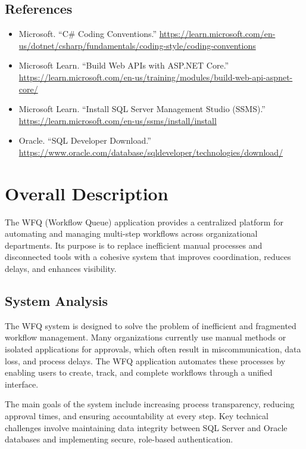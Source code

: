 \documentclass[12pt]{article}
\begin{document}
\subsection{References}
\begin{itemize}
    \item Microsoft. ``C\# Coding Conventions.'' \url{https://learn.microsoft.com/en-us/dotnet/csharp/fundamentals/coding-style/coding-conventions}
    \item Microsoft Learn. ``Build Web APIs with ASP.NET Core.'' \url{https://learn.microsoft.com/en-us/training/modules/build-web-api-aspnet-core/}
    \item Microsoft Learn. ``Install SQL Server Management Studio (SSMS).'' \url{https://learn.microsoft.com/en-us/ssms/install/install}
    \item Oracle. ``SQL Developer Download.'' \url{https://www.oracle.com/database/sqldeveloper/technologies/download/}
\end{itemize}

\section{Overall Description}

The WFQ (Workflow Queue) application provides a centralized platform for automating and
managing multi-step workflows across organizational departments. Its purpose is to replace
inefficient manual processes and disconnected tools with a cohesive system that improves
coordination, reduces delays, and enhances visibility.

\subsection{System Analysis}
The WFQ system is designed to solve the problem of inefficient and fragmented workflow
management. Many organizations currently use manual methods or isolated applications for
approvals, which often result in miscommunication, data loss, and process delays. The WFQ
application automates these processes by enabling users to create, track, and complete
workflows through a unified interface.

The main goals of the system include increasing process transparency, reducing approval times,
and ensuring accountability at every step. Key technical challenges involve maintaining data
integrity between SQL Server and Oracle databases and implementing secure, role-based
authentication.
\end{document}
